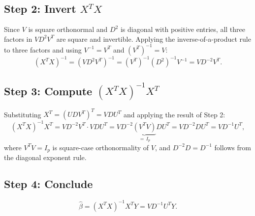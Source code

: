 \documentclass{article}
\begin{document}
\subsection*{Step 2: Invert $X^TX$}

Since $V$ is square orthonormal and $D^2$ is diagonal with positive entries, all three
factors in $VD^2V^T$ are square and invertible. Applying the inverse-of-a-product rule
to three factors and using $V^{-1} = V^T$ and $(V^T)^{-1} = V$:
\[
    (X^TX)^{-1} = (VD^2V^T)^{-1} = (V^T)^{-1}(D^2)^{-1}V^{-1} = V D^{-2} V^T.
\]

\subsection*{Step 3: Compute $(X^TX)^{-1}X^T$}

Substituting $X^T = (UDV^T)^T = VDU^T$ and applying the result of Step 2:
\[
    (X^TX)^{-1}X^T = VD^{-2}V^T \cdot VDU^T
    = VD^{-2}\underbrace{(V^TV)}_{=\,I_p}DU^T = VD^{-2}DU^T = VD^{-1}U^T,
\]
where $V^TV = I_p$ is square-case orthonormality of $V$, and $D^{-2}D = D^{-1}$ follows
from the diagonal exponent rule.

\subsection*{Step 4: Conclude}

\[
    \boxed{\hat{\beta} = (X^TX)^{-1}X^TY = VD^{-1}U^TY.}
\]
\end{document}
